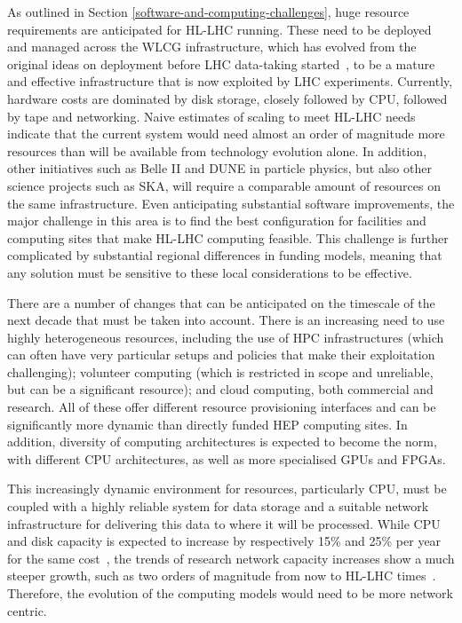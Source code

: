 As outlined in Section \ref{software-and-computing-challenges},
huge resource requirements are anticipated for
HL-LHC running. These need to be deployed and managed across the WLCG
infrastructure, which has evolved from the original ideas on deployment
before LHC data-taking started~\cite{MONARC}, to be a mature and
effective infrastructure that is now exploited by LHC experiments.
Currently, hardware costs are dominated by disk storage, closely
followed by CPU, followed by tape and networking. Naive estimates of
scaling to meet HL-LHC needs indicate that the current system would need
almost an order of magnitude more resources than will be available from
technology evolution alone. In addition, other initiatives such as Belle
II and DUNE in particle physics, but also other science projects such as
SKA, will require a comparable amount of resources on the same
infrastructure. Even anticipating substantial software improvements, the
major challenge in this area is to find the best configuration for
facilities and computing sites that make HL-LHC computing feasible. This
challenge is further complicated by substantial regional differences in
funding models, meaning that any solution must be sensitive to these
local considerations to be effective.

There are a number of changes that can be anticipated on the timescale
of the next decade that must be taken into account. There is an
increasing need to use highly heterogeneous resources, including the
use of HPC infrastructures (which can often have very particular setups
and policies that make their exploitation challenging); volunteer
computing (which is restricted in scope and unreliable, but can be a
significant resource); and cloud computing,
both commercial and research. All of these offer different resource
provisioning interfaces and can be significantly more dynamic than
directly funded HEP computing sites. In addition, diversity of computing
architectures is expected to become the norm, with different CPU
architectures, as well as more specialised GPUs and FPGAs.

This increasingly dynamic environment for resources, particularly CPU,
must be coupled with a highly reliable system for data storage and a
suitable network infrastructure for delivering this data to where it
will be processed. While CPU and disk capacity is expected to increase
by respectively 15\% and 25\% per year for the same cost~\cite{CERN-COST-EST}, the trends of
research network capacity increases show a much steeper growth, such as
two orders of magnitude from now to HL-LHC times~\cite{Roberts:17}. Therefore, the
evolution of the computing models would need to be more network centric.

